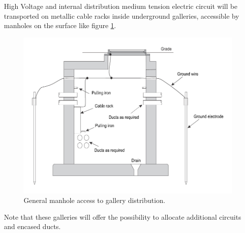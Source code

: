 	High Voltage and internal distribution medium tension electric circuit will be transported on metallic cable racks inside underground galleries, accessible by manholes on the surface like figure \ref{manhole}.
	
	\begin{figure}[H]
		\centering
		\includegraphics[clip, trim=0cm 0cm 0cm 0cm, width=.8\textwidth]{./images/electric/manhole}
		\caption{General manhole access to gallery distribution.}
		\label{manhole}
	\end{figure}
	
	Note that these galleries will offer the possibility to allocate additional circuits and encased ducts.